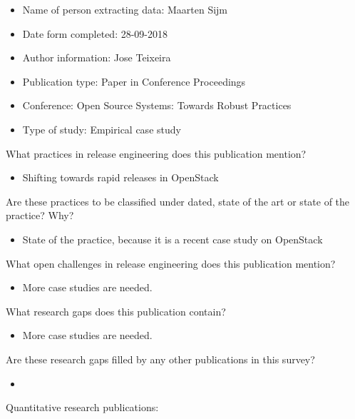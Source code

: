 \documentclass[]{book}
\providecommand{\tightlist}{%
  \setlength{\itemsep}{0pt}\setlength{\parskip}{0pt}}
\begin{document}
\begin{itemize}
\tightlist
\item
  Name of person extracting data: Maarten Sijm
\item
  Date form completed: 28-09-2018
\item
  Author information: Jose Teixeira
\item
  Publication type: Paper in Conference Proceedings
\item
  Conference: Open Source Systems: Towards Robust Practices
\item
  Type of study: Empirical case study
\end{itemize}

What practices in release engineering does this publication mention?

\begin{itemize}
\tightlist
\item
  Shifting towards rapid releases in OpenStack
\end{itemize}

Are these practices to be classified under dated, state of the art or
state of the practice? Why?

\begin{itemize}
\tightlist
\item
  State of the practice, because it is a recent case study on OpenStack
\end{itemize}

What open challenges in release engineering does this publication
mention?

\begin{itemize}
\tightlist
\item
  More case studies are needed.
\end{itemize}

What research gaps does this publication contain?

\begin{itemize}
\tightlist
\item
  More case studies are needed.
\end{itemize}

Are these research gaps filled by any other publications in this survey?

\begin{itemize}
\item
\end{itemize}

Quantitative research publications:
\end{document}
